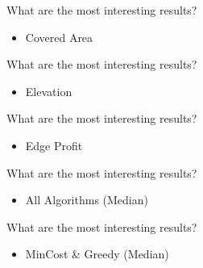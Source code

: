 \documentclass[aspectratio=169,xcolor=dvipsnames, t]{beamer}
\begin{document}
	\begin{frame}
		\vspace{0.25cm}
		\Large{What are the most interesting results?}\normalsize
		\vspace{0.25cm}
		\begin{itemize}
			\item Covered Area
		\end{itemize}
		
		\centering
		
	\end{frame}
	
	\begin{frame}
		\vspace{0.25cm}
		\Large{What are the most interesting results?}\normalsize
		\vspace{0.25cm}
		\begin{itemize}
			\item Elevation
		\end{itemize}
		
		\centering
		
	\end{frame}
	
	\begin{frame}
		\vspace{0.25cm}
		\Large{What are the most interesting results?}\normalsize
		\vspace{0.25cm}
		\begin{itemize}
			\item Edge Profit
		\end{itemize}
		
		\centering
		
	\end{frame}
	
	\begin{frame}
		\vspace{0.25cm}
		\Large{What are the most interesting results?}\normalsize
		\vspace{0.25cm}
		\begin{itemize}
			\item All Algorithms (Median)
		\end{itemize}
		
		\centering
		
	\end{frame}
	
	\begin{frame}
		\vspace{0.25cm}
		\Large{What are the most interesting results?}\normalsize
		\vspace{0.25cm}
		\begin{itemize}
			\item MinCost \& Greedy (Median)
		\end{itemize}
		
		\centering
		
	\end{frame}
	
\end{document}
